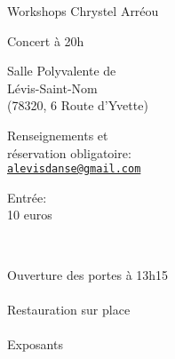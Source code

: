 \documentclass[12pt,a4paper]{article}
\begin{document}
\begin{flushleft}
  \fontsize{32pt}{40pt}\selectfont

\fontsize{48pt}{48pt}
\selectfont
\quad Workshops Chrystel Arréou

\quad Concert à 20h %
\end{flushleft}




\vspace*{15mm}

\fontsize{20pt}{20pt}\selectfont

Salle Polyvalente de \\
Lévis-Saint-Nom\\
{\fontsize{14pt}{16pt}\selectfont
(78320, 6 Route d'Yvette)}

\vspace*{5mm}

Renseignements et \\
réservation obligatoire: \\
\href{mailto:alevisdanse@gmail.com}{\texttt{\color{blue}alevisdanse@gmail.com}}

\vspace*{5mm}

Entrée: \\
10 euros

\vspace*{-30mm}
\vfill

~\hfill\begin{minipage}{0.35\linewidth}
  \begin{center}
    Ouverture des portes
    à 13h15\\
    ~\\
    Restauration
    sur place\\
    ~\\
    Exposants
\end{center}
\end{minipage}

\end{document}
